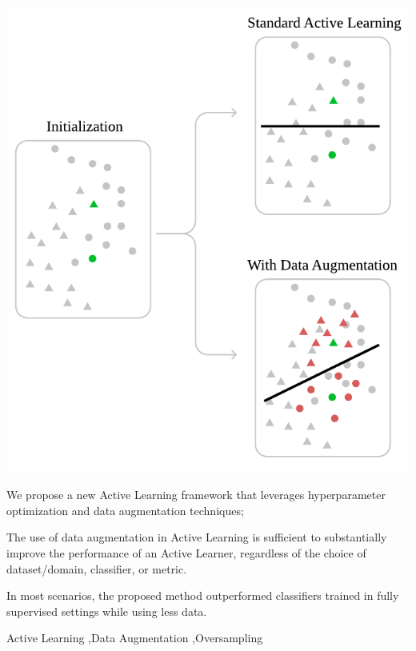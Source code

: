 \documentclass[preprint, 12pt]{elsarticle}
\begin{document}
\begin{frontmatter}
\begin{graphicalabstract}
    \includegraphics{../analysis/graphical_abstract}
\end{graphicalabstract}

\begin{highlights}
    \item We propose a new Active Learning framework that leverages
        hyperparameter optimization and data augmentation techniques;
    \item The use of data augmentation in Active Learning is sufficient to
        substantially improve the performance of an Active Learner, regardless
        of the choice of dataset/domain, classifier, or metric.
    \item In most scenarios, the proposed method outperformed classifiers
        trained in fully supervised settings while using less data.
\end{highlights}

\begin{keyword}
Active Learning \sep\@ Data Augmentation \sep\@ Oversampling
\end{keyword}

\end{frontmatter}
\end{document}
